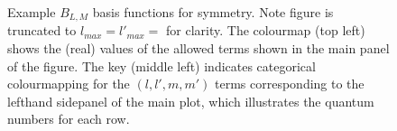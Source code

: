 \documentclass[letterpaper,table,10pt,english]{jupyterBook}
\begin{document}
\begin{figure}[htbp]
\centering
\capstart

\noindent{}
\caption{Example \(B_{L,M}\) basis functions for  symmetry. Note figure is truncated to \(l_{max}=l'_{max}=\) for clarity. The colour\sphinxhyphen{}map (top left) shows the (real) values of the allowed terms shown in the main panel of the figure. The key (middle left) indicates categorical colour\sphinxhyphen{}mapping for the \((l,l',m,m')\) terms corresponding to the left\sphinxhyphen{}hand side\sphinxhyphen{}panel of the main plot, which illustrates the quantum numbers for each row.}\label{\detokenize{part1/theory_tensor_formalism_160723:fig-blm-basis-d2h}}\end{figure}
\end{document}
